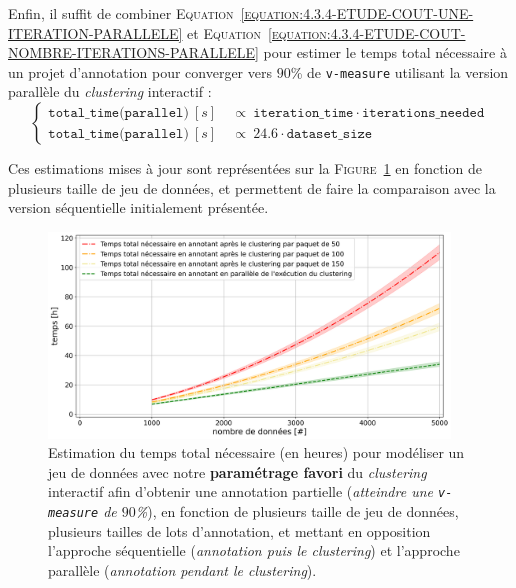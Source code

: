 			Enfin, il suffit de combiner \textsc{Equation~\ref{equation:4.3.4-ETUDE-COUT-UNE-ITERATION-PARALLELE}} et \textsc{Equation~\ref{equation:4.3.4-ETUDE-COUT-NOMBRE-ITERATIONS-PARALLELE}} pour estimer le temps total nécessaire à un projet d'annotation pour converger vers $90$\% de \texttt{v-measure} utilisant la version parallèle du \textit{clustering} interactif :
			\begin{equation}
				\label{equation:4.3.4-ETUDE-COUT-TOTAL-PARALLELE}
				\begin{cases}
					\texttt{total\_time(parallel)}~[s] &
						~\propto~\texttt{iteration\_time} \cdot \texttt{iterations\_needed} \\
					\texttt{total\_time(parallel)}~[s] &
						~\propto~24.6 \cdot \texttt{dataset\_size}
				\end{cases}
			\end{equation}
			
			Ces estimations mises à jour sont représentées sur la \textsc{Figure~\ref{figure:4.3.4-ETUDE-COUT-TOTAL}} en fonction de plusieurs taille de jeu de données, et permettent de faire la comparaison avec la version séquentielle initialement présentée.
			
			\begin{figure}[!htb]
				\centering
				\includegraphics[width=0.95\textwidth]{figures/etude-temps-total-2-modelisation-parallele}
				\caption{
					Estimation du temps total nécessaire (en heures) pour modéliser un jeu de données avec notre \textbf{paramétrage favori} du \textit{clustering} interactif afin d'obtenir une annotation partielle (\textit{atteindre une \texttt{v-measure} de $90$\%}), en fonction de plusieurs taille de jeu de données, plusieurs tailles de lots d'annotation, et mettant en opposition l'approche séquentielle (\textit{annotation puis le clustering}) et l'approche parallèle (\textit{annotation pendant le clustering}).
				}
				\label{figure:4.3.4-ETUDE-COUT-TOTAL}
			\end{figure}
			
